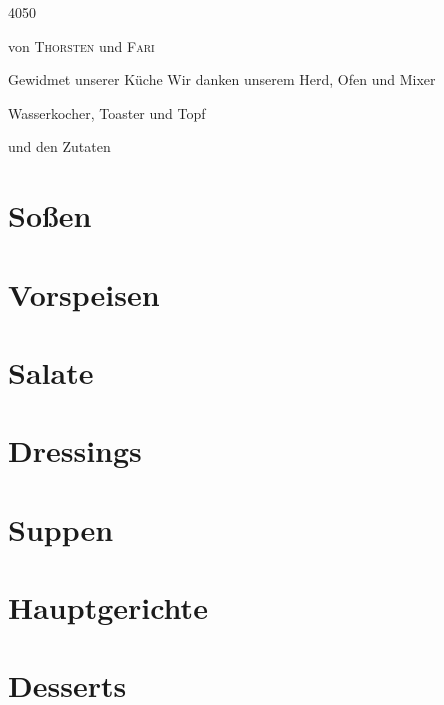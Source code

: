 \documentclass[11pt, a4paper, twoside]{book} %
\makeatletter
\newcommand\HUGE{\@setfontsize\Huge{40}{50}}
\makeatother
\begin{document}
\renewcommand{\indexname}{Stichwortverzeichnis}

\justify
\setlength\parindent{0pt}

\thispagestyle{empty}
\vspace*{3cm}
\begin{center}
{\HUGE{\textsc{}}}
\vspace{2cm}

{\Large{von}
\vfill
\Huge\textsc{Thorsten} 
\vfill
\Large{und}
\vfill
\Huge\textsc{Fari}}
\vspace{2cm}

Gewidmet unserer K\"uche
\vfill
Wir danken unserem Herd, Ofen und Mixer

Wasserkocher, Toaster und Topf

und den Zutaten
\end{center}
\vspace{3cm}
\newpage

\tableofcontents


\chapter{So\ss{}en}
\thispagestyle{empty}

\chapter{Vorspeisen}
\thispagestyle{empty}

\chapter{Salate}
\thispagestyle{empty}

\chapter{Dressings}
\thispagestyle{empty}

\chapter{Suppen}
\thispagestyle{empty}

\chapter{Hauptgerichte}
\thispagestyle{empty}

\chapter{Desserts}
\thispagestyle{empty}

\end{document}
